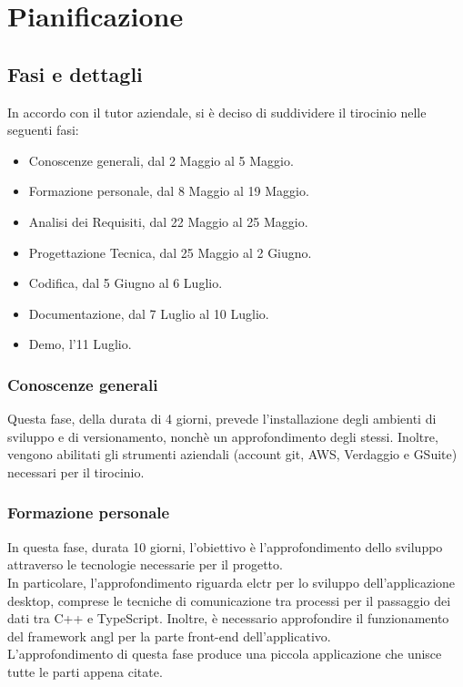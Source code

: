 \section{Pianificazione}

\subsection{Fasi e dettagli}

In accordo con il tutor aziendale, si è deciso di suddividere il tirocinio nelle seguenti fasi:
\begin{itemize}
    \item Conoscenze generali, dal 2 Maggio al 5 Maggio.
    \item Formazione personale, dal 8 Maggio al 19 Maggio.
    \item Analisi dei Requisiti, dal 22 Maggio al 25 Maggio.
    \item Progettazione Tecnica, dal 25 Maggio al 2 Giugno.
    \item Codifica, dal 5 Giugno al 6 Luglio.
    \item Documentazione, dal 7 Luglio al 10 Luglio.
    \item Demo, l'11 Luglio.
\end{itemize}

\subsubsection{Conoscenze generali}
Questa fase, della durata di 4 giorni, prevede l'installazione degli ambienti di sviluppo e di versionamento, nonchè un approfondimento degli stessi. Inoltre, vengono abilitati gli strumenti aziendali (account git, AWS, Verdaggio e GSuite) necessari per il tirocinio.
\subsubsection{Formazione personale}
In questa fase, durata 10 giorni, l'obiettivo è l'approfondimento dello sviluppo attraverso le tecnologie necessarie per il progetto.\\
In particolare, l'approfondimento riguarda \gls{elctr} per lo sviluppo dell'applicazione desktop, comprese le tecniche di comunicazione tra processi per il passaggio dei dati tra C++ e TypeScript. Inoltre, è necessario approfondire il funzionamento del framework \gls{angl} per la parte front-end dell'applicativo.\\
L'approfondimento di questa fase produce una piccola applicazione che unisce tutte le parti appena citate.
